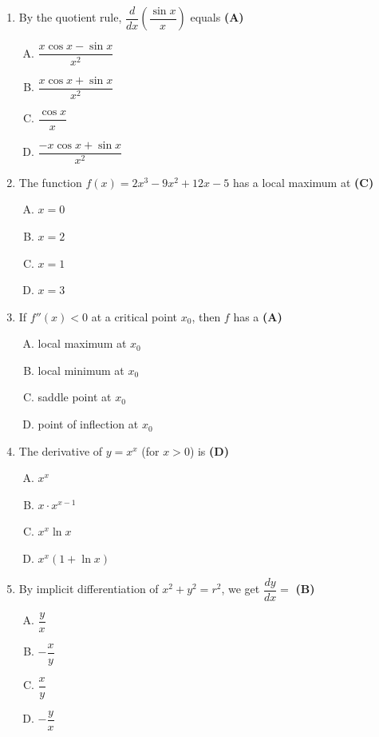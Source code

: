\documentclass[10pt,a4paper]{article}
\begin{document}
\begin{enumerate}[1.]
\item By the quotient rule, $\dfrac{d}{dx}\!\left(\dfrac{\sin x}{x}\right)$ equals \hfill \textbf{(A)}
\begin{enumerate}[(A)]
    \item $\dfrac{x\cos x - \sin x}{x^2}$
    \item $\dfrac{x\cos x + \sin x}{x^2}$
    \item $\dfrac{\cos x}{x}$
    \item $\dfrac{-x\cos x + \sin x}{x^2}$
\end{enumerate}

\item The function $f(x) = 2x^3 - 9x^2 + 12x - 5$ has a local maximum at \hfill \textbf{(C)}
\begin{enumerate}[(A)]
    \item $x = 0$
    \item $x = 2$
    \item $x = 1$
    \item $x = 3$
\end{enumerate}

\item If $f''(x) < 0$ at a critical point $x_0$, then $f$ has a \hfill \textbf{(A)}
\begin{enumerate}[(A)]
    \item local maximum at $x_0$
    \item local minimum at $x_0$
    \item saddle point at $x_0$
    \item point of inflection at $x_0$
\end{enumerate}

\item The derivative of $y = x^x$ (for $x>0$) is \hfill \textbf{(D)}
\begin{enumerate}[(A)]
    \item $x^x$
    \item $x \cdot x^{x-1}$
    \item $x^x \ln x$
    \item $x^x(1 + \ln x)$
\end{enumerate}

\item By implicit differentiation of $x^2 + y^2 = r^2$, we get $\dfrac{dy}{dx} =$  \hfill \textbf{(B)}
\begin{enumerate}[(A)]
    \item $\dfrac{y}{x}$
    \item $-\dfrac{x}{y}$
    \item $\dfrac{x}{y}$
    \item $-\dfrac{y}{x}$
\end{enumerate}


\end{enumerate}
\end{document}
